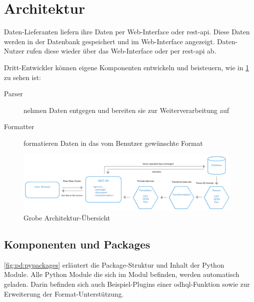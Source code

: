 \section{Architektur}
Daten-Lieferanten liefern ihre Daten per Web-Interface oder \acs{rest}-\acs{api}. Diese Daten werden in der Datenbank gespeichert und im Web-Interface angezeigt. Daten-Nutzer rufen diese wieder über das Web-Interface oder per \acs{rest}-\acs{api} ab. 

Dritt-Entwickler können eigene Komponenten entwickeln und beisteuern, wie in \cref{fig:pd:arch-overview} zu sehen ist:
\begin{description}
\item[Parser] nehmen Daten entgegen und bereiten sie zur Weiterverarbeitung auf
\item[Formatter] formatieren Daten in das vom Benutzer gewünschte Format
\end{description}

\begin{figure}[H]
    \centering
    \includegraphics[width=\linewidth]{fig/ODH-Architecture-Overview}
    \caption{Grobe Architektur-Übersicht}
    \label{fig:pd:arch-overview}
\end{figure}

\subsection{Komponenten und Packages}
\cref{fig:pd:pypackages} erläutert die Package-Struktur und Inhalt der Python Module. Alle Python Module die sich im  Modul befinden, werden automatisch geladen. Darin befinden sich auch Beispiel-Plugins einer \acs{odhql}-Funktion sowie zur Erweiterung der Format-Unterstützung.


